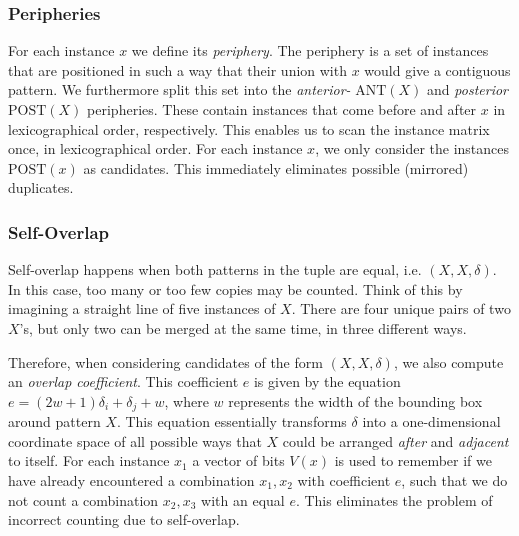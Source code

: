 \documentclass{llncs}
\begin{document}
\subsubsection{Peripheries}
For each instance $x$ we define its \emph{periphery}. The periphery is a set of instances that are positioned in such a way that their union with $x$ would give a contiguous pattern. We furthermore split this set into the \emph{anterior-} $\mathrm{ANT}(X)$ and \emph{posterior} $\mathrm{POST}(X)$ peripheries. These contain instances that come before and after $x$ in lexicographical order, respectively. This enables us to scan the instance matrix once, in lexicographical order. For each instance $x$, we only consider the instances $\mathrm{POST}(x)$ as candidates. This immediately eliminates possible (mirrored) duplicates. 


\subsubsection{Self-Overlap}
Self-overlap happens when both patterns in the tuple are equal, i.e. $(X,X,\delta)$. In this case, too many or too few copies may be counted. Think of this by imagining a straight line of five instances of $X$. There are four unique pairs of two $X$'s, but only two can be merged at the same time, in three different ways.

Therefore, when considering candidates of the form $(X,X,\delta)$, we also compute an \emph{overlap coefficient}. This coefficient $e$ is given by the equation $e = (2w+1)\delta_i + \delta_j + w$, where $w$ represents the width of the bounding box around pattern $X$. This equation essentially transforms $\delta$ into a one-dimensional coordinate space of all possible ways that $X$ could be arranged \emph{after} and \emph{adjacent} to itself. For each instance $x_1$ a vector of bits $V(x)$ is used to remember if we have already encountered a combination $x_1,x_2$ with coefficient $e$, such that we do not count a combination $x_2,x_3$ with an equal $e$. This eliminates the problem of incorrect counting due to self-overlap.
\end{document}
